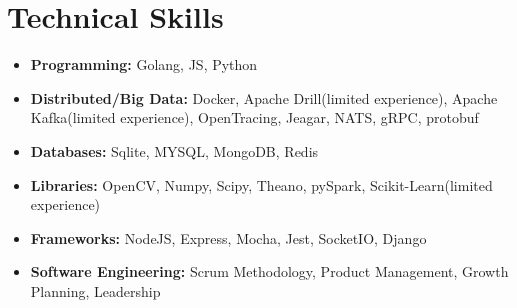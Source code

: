 \documentclass[10pt,a4paper,roman]{moderncv}        %
\begin{document}
\section{Technical Skills}
\begin{itemize} \itemsep \shortSpace
\item \textbf{Programming:} Golang, JS, Python

\item \textbf{Distributed/Big Data:} Docker, Apache Drill(limited experience), Apache Kafka(limited experience), OpenTracing, Jeagar, NATS, gRPC, protobuf

\item \textbf{Databases:} Sqlite, MYSQL, MongoDB, Redis

\item \textbf{Libraries:} OpenCV, Numpy, Scipy, Theano, pySpark, Scikit-Learn(limited experience)

\item \textbf{Frameworks:} NodeJS, Express, Mocha, Jest, SocketIO, Django

\item \textbf{Software Engineering:} Scrum Methodology, Product Management, Growth Planning, Leadership

\end{itemize}
\end{document}
